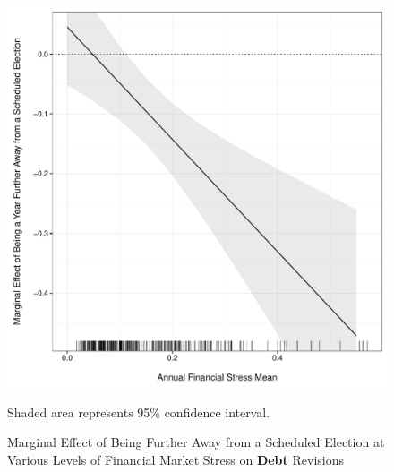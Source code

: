 \documentclass[]{article}
\begin{document}
\begin{figure}
    \caption{Marginal Effect of Being Further Away from a Scheduled Election at Various Levels of Financial Market Stress on \textbf{Debt} Revisions}
    \label{me_finstress_elect}

    \begin{center}
        \includegraphics[scale=0.4]{figures/fsi_elect_debt_me.pdf}
    \end{center}

	{\scriptsize{Shaded area represents 95\% confidence interval.}}

\end{figure}
\end{document}
